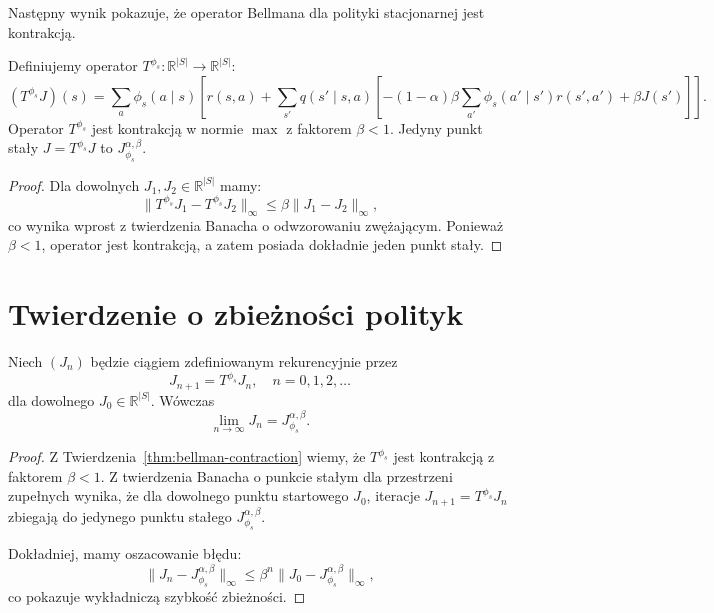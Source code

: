 Następny wynik pokazuje, że operator Bellmana dla polityki stacjonarnej jest kontrakcją.

\begin{theorem}
\label{thm:bellman-contraction}
Definiujemy operator $T^{\phi_s}: \mathbb{R}^{|S|} \to \mathbb{R}^{|S|}$:
\begin{equation}
(T^{\phi_s} J)(s) = \sum_a \phi_s(a\mid s) \left[ r(s, a) + \sum_{s'} q(s'\mid s, a) \left[ -(1 - \alpha)\beta \sum_{a'} \phi_s(a'\mid s') r(s', a') + \beta J(s') \right] \right].
\end{equation}
Operator $T^{\phi_s}$ jest kontrakcją w normie $\max$ z faktorem $\beta < 1$. Jedyny punkt stały $J = T^{\phi_s} J$ to $J^{\alpha, \beta}_{\phi_s}$.
\end{theorem}

\begin{proof}
Dla dowolnych $J_1, J_2 \in \mathbb{R}^{|S|}$ mamy:
\[
\|T^{\phi_s} J_1 - T^{\phi_s} J_2\|_\infty \leq \beta \|J_1 - J_2\|_\infty,
\]
co wynika wprost z twierdzenia Banacha o odwzorowaniu zwężającym. Ponieważ $\beta < 1$, operator jest kontrakcją, a zatem posiada dokładnie jeden punkt stały.
\end{proof}

\section{Twierdzenie o zbieżności polityk}

\begin{theorem}
\label{thm:policy-convergence}
Niech $(J_n)$ będzie ciągiem zdefiniowanym rekurencyjnie przez
\[
J_{n+1} = T^{\phi_s} J_n, \quad n = 0, 1, 2, \ldots
\]
dla dowolnego $J_0 \in \mathbb{R}^{|S|}$. Wówczas
\[
\lim_{n \to \infty} J_n = J^{\alpha, \beta}_{\phi_s}.
\]
\end{theorem}

\begin{proof}
Z Twierdzenia~\ref{thm:bellman-contraction} wiemy, że $T^{\phi_s}$ jest kontrakcją z faktorem $\beta < 1$. Z twierdzenia Banacha o punkcie stałym dla przestrzeni zupełnych wynika, że dla dowolnego punktu startowego $J_0$, iteracje $J_{n+1} = T^{\phi_s} J_n$ zbiegają do jedynego punktu stałego $J^{\alpha, \beta}_{\phi_s}$.

Dokładniej, mamy oszacowanie błędu:
\[
\|J_n - J^{\alpha, \beta}_{\phi_s}\|_\infty \leq \beta^n \|J_0 - J^{\alpha, \beta}_{\phi_s}\|_\infty,
\]
co pokazuje wykładniczą szybkość zbieżności.
\end{proof}

